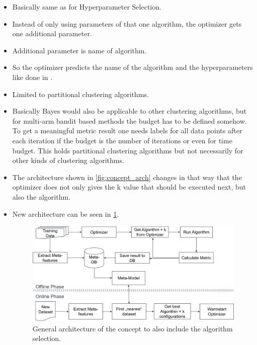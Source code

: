 \begin{itemize}
    \item Basically same as for Hyperparameter Selection.
    \item Instead of only using parameters of that one algorithm, the optimizer gets one additional parameter.
    \item Additional parameter is name of algorithm.
    \item So the optimizer predicts the name of the algorithm and the hyperparameters like done in \cite{ThorntonAuto-WEKA:Algorithms}.
    \item Limited to partitional clustering algorithms.
    \item Basically Bayes would also be applicable to other clustering algorithms, but for multi-arm bandit based methods the budget has to be defined somehow.
    To get a meaningful metric result one needs labels for all data points after each iteration if the budget is the number of iterations or even for time budget.
    This holds partitional clustering algorithms but not necessarily for other kinds of clustering algorithms.
    \item The architecture shown in \cref{fig:concept_arch} changes in that way that the optimizer does not only gives the k value that should be executed next, but also the algorithm.
    \item New architecture can be seen in \cref{fig:archAlgoSelection}.
    \begin{figure}
        \centering
        \includegraphics[width=\textwidth]{main/concept_architecture_algo_selection.png}
        \caption{General architecture of the concept to also include the algorithm selection.}
        \label{fig:archAlgoSelection}
    \end{figure}
    
\end{itemize}